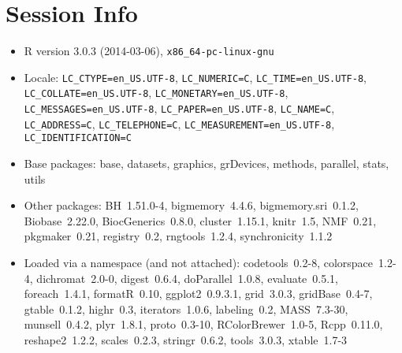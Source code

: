 \documentclass[a4paper]{article}\usepackage[]{graphicx}\usepackage[]{color}
\begin{document}
\section{Session Info}
\begin{itemize}\raggedright
  \item R version 3.0.3 (2014-03-06), \verb|x86_64-pc-linux-gnu|
  \item Locale: \verb|LC_CTYPE=en_US.UTF-8|, \verb|LC_NUMERIC=C|, \verb|LC_TIME=en_US.UTF-8|, \verb|LC_COLLATE=en_US.UTF-8|, \verb|LC_MONETARY=en_US.UTF-8|, \verb|LC_MESSAGES=en_US.UTF-8|, \verb|LC_PAPER=en_US.UTF-8|, \verb|LC_NAME=C|, \verb|LC_ADDRESS=C|, \verb|LC_TELEPHONE=C|, \verb|LC_MEASUREMENT=en_US.UTF-8|, \verb|LC_IDENTIFICATION=C|
  \item Base packages: base, datasets, graphics, grDevices,
    methods, parallel, stats, utils
  \item Other packages: BH~1.51.0-4, bigmemory~4.4.6,
    bigmemory.sri~0.1.2, Biobase~2.22.0, BiocGenerics~0.8.0,
    cluster~1.15.1, knitr~1.5, NMF~0.21, pkgmaker~0.21,
    registry~0.2, rngtools~1.2.4, synchronicity~1.1.2
  \item Loaded via a namespace (and not attached):
    codetools~0.2-8, colorspace~1.2-4, dichromat~2.0-0,
    digest~0.6.4, doParallel~1.0.8, evaluate~0.5.1, foreach~1.4.1,
    formatR~0.10, ggplot2~0.9.3.1, grid~3.0.3, gridBase~0.4-7,
    gtable~0.1.2, highr~0.3, iterators~1.0.6, labeling~0.2,
    MASS~7.3-30, munsell~0.4.2, plyr~1.8.1, proto~0.3-10,
    RColorBrewer~1.0-5, Rcpp~0.11.0, reshape2~1.2.2, scales~0.2.3,
    stringr~0.6.2, tools~3.0.3, xtable~1.7-3
\end{itemize}



\printbibliography[heading=bibintoc]
\end{document}
